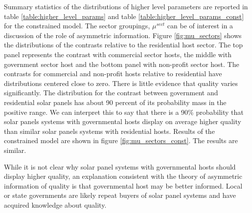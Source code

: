 \documentclass[a4paper]{article}
\begin{document}
Summary statistics of the distributions of higher level parameters are reported in table \ref{table:higher_level_params} and table \ref{table:higher_level_params_const} for the constrained model. The sector groupings, $\mu^{sect}$ can be of interest in a discussion of the role of asymmetric information. Figure \ref{fig:mu_sectors} shows the distributions of the contrasts relative to the residential host sector. The top panel represents the contrast with commercial sector hosts, the middle with government sector host and the bottom panel with non-profit sector host. The contrasts for commercial and non-profit hosts relative to residential have distributions centered close to zero. There is little evidence that quality varies significantly. The distribution for the contrast between government and residential solar panels has about 90 percent of its probability mass in the positive range. We can interpret this to say that there is a 90\% probability that solar panels systems with governmental hosts display on average higher quality than similar solar panels systems with residential hosts. Results of the constrained model are shown in figure \ref{fig:mu_sectors_const}. The results are similar.

While it is not clear why solar panel systems with governmental hosts should display higher quality, an explanation consistent with the theory of asymmetric information of quality is that governmental host may be better informed. Local or state governments are likely repeat buyers of solar panel systems and have acquired knowledge about quality.
\end{document}
